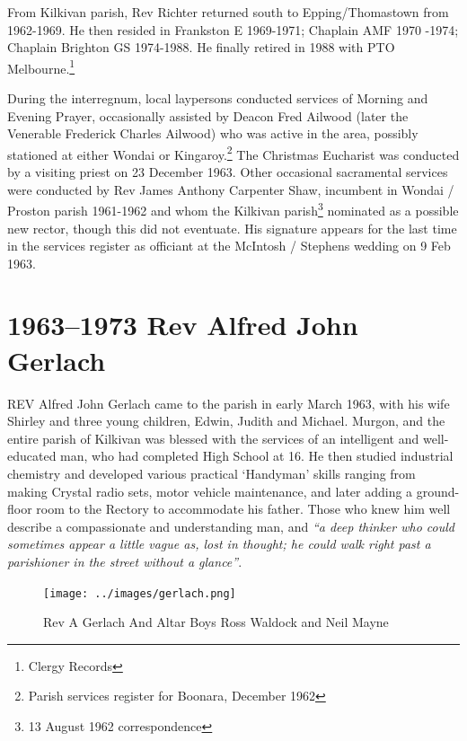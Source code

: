 From Kilkivan parish, Rev Richter returned south to Epping/Thomastown from 1962-1969. He then resided in Frankston E 1969-1971; Chaplain AMF 1970 -1974; Chaplain Brighton GS 1974-1988. He finally retired in 1988 with PTO Melbourne.\footnote{Clergy Records}


During the interregnum, local laypersons conducted services of Morning and Evening Prayer, occasionally assisted by Deacon Fred Ailwood (later the Venerable Frederick Charles Ailwood) who was active in the area, possibly stationed at either Wondai or Kingaroy.\footnote{Parish services register for Boonara, December 1962} The Christmas Eucharist was conducted by a visiting priest on 23 December 1963. Other occasional sacramental services were conducted by Rev James Anthony Carpenter Shaw, incumbent in Wondai / Proston parish 1961-1962 and whom the Kilkivan parish\footnote{13 August 1962 correspondence} nominated as a possible new rector, though this did not eventuate. His signature appears for the last time in the services register as officiant at the McIntosh / Stephens wedding on 9 Feb 1963.


\balance


\printendnotes[custom]
\setcounter{endnote}{0}
\chapter{1963--1973 Rev Alfred John Gerlach}
\nobalance


\lettrine[lines=3]{R}{EV}
 Alfred John Gerlach came to the parish in early March 1963, with his wife Shirley and three young children, Edwin, Judith and Michael. Murgon, and the entire parish of Kilkivan was blessed with the services of an intelligent and well-educated man, who had completed High School at 16. He then studied industrial chemistry and developed various practical `Handyman' skills ranging from making Crystal radio sets, motor vehicle maintenance, and later adding a ground-floor room to the Rectory to accommodate his father. Those who knew him well describe a compassionate and understanding man, and \emph{``a deep thinker who could sometimes appear a little vague as, lost in thought; he could walk right past a parishioner in the street without a glance''}.







\begin{figure}[!htb]
\begin{center}
\texttt{[image: ../images/gerlach.png]}
\caption{Rev A Gerlach And Altar Boys Ross Waldock and Neil Mayne}
\end{center}
\end{figure}




